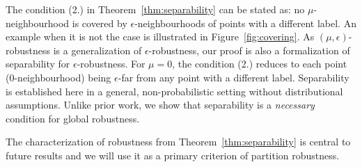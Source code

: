 The condition (2.) in Theorem~\ref{thm:separability} can be stated as: no $\mu$-neighbourhood is covered by $\epsilon$-neighbourhoods of points with a different label. An example when it is not the case is illustrated in Figure~\ref{fig:covering}. As $(\mu, \epsilon)$-robustness is a generalization of $\epsilon$-robustness, our proof is also a formalization of separability for $\epsilon$-robustness. For $\mu = 0$, the condition (2.) reduces to each point (0-neighbourhood) being $\epsilon$-far from any point with a different label. Separability is established here in a general, non-probabilistic setting without distributional assumptions. Unlike prior work, we show that separability is a \emph{necessary} condition for global robustness. 

The characterization of robustness from Theorem~\ref{thm:separability} is central to future results and we will use it as a primary criterion of partition robustness.

